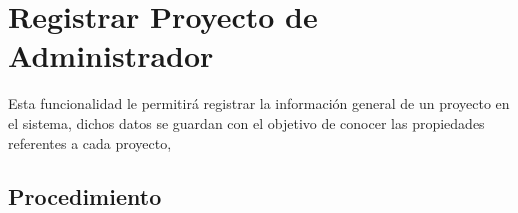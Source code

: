 \hypertarget{cv:registrarProyectoAdmin}{\section{Registrar Proyecto de Administrador}} \label{sec:registrarProyectoAdmin}

	Esta funcionalidad le permitirá registrar la información general de un proyecto en el sistema, dichos datos se guardan con el objetivo de conocer las propiedades referentes a cada proyecto, 

		\subsection{Procedimiento}

